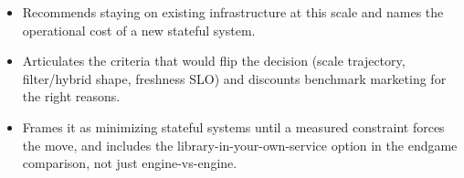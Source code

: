 \begin{interviewq}
\goodgreat
\begin{itemize}
    \item {} Recommends staying on existing infrastructure at this scale and names the operational cost of a new stateful system.
    \item {} Articulates the criteria that would flip the decision (scale trajectory, filter/hybrid shape, freshness SLO) and discounts benchmark marketing for the right reasons.
    \item {} Frames it as minimizing stateful systems until a measured constraint forces the move, and includes the library-in-your-own-service option in the endgame comparison, not just engine-vs-engine.
\end{itemize}

\end{interviewq}

